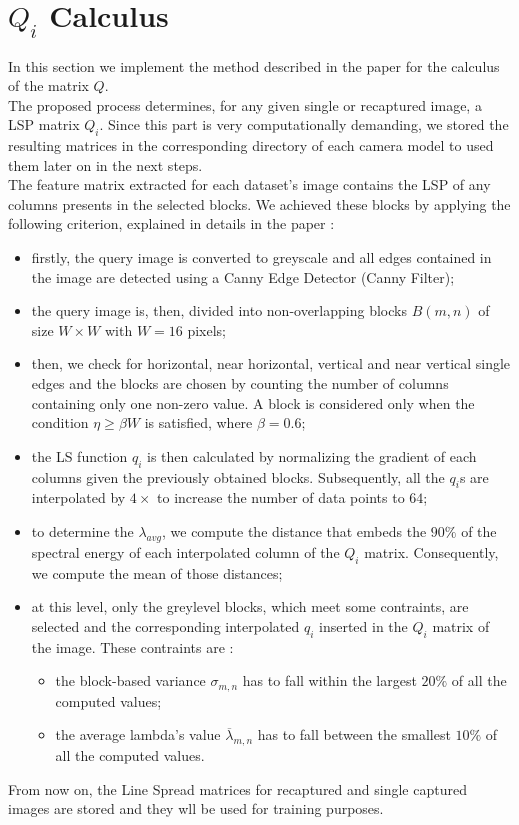 \section{$Q_i$ Calculus}
    In this section we implement the method described in the paper \cite{paper} for the calculus of the matrix $Q$.\\
    The proposed process determines, for any given single or recaptured image, a LSP matrix $Q_i$. 
    Since this part is very computationally demanding, we stored the resulting matrices in the corresponding directory of each camera model to used them later on in the next steps.\\

    The feature matrix extracted for each dataset's image contains the LSP of any columns presents in the selected blocks. We achieved these blocks by applying the following criterion, explained in details in the paper :
    \begin{itemize}
        \item firstly, the query image is converted to greyscale and all edges contained in the image are detected using a Canny Edge Detector (Canny Filter);
        \item the query image is, then, divided into non-overlapping blocks $B(m,n)$ of size $W \times W$ with $W=16$ pixels;
        \item then, we check for horizontal, near horizontal, vertical and near vertical single edges and the blocks are chosen by counting the number of columns containing only one non-zero value. A block is considered only when the condition $\eta \geq \beta W$ is satisfied, where $\beta=0.6$;
        \item the LS function $q_i$ is then calculated by normalizing the gradient of each columns given the previously obtained blocks. Subsequently, all the $q_i$s are interpolated by $4 \times$ to increase the number of data points to $64$;
        \item to determine the $\lambda_{avg}$, we compute the distance that embeds the $90\%$ of the spectral energy of each interpolated column of the $Q_i$ matrix. Consequently, we compute the mean of those distances;
        \item at this level, only the greylevel blocks, which meet some contraints, are selected and the corresponding interpolated $q_i$ inserted in the $Q_i$ matrix of the image. These contraints are :
        \begin{itemize}
            \item the block-based variance $\sigma_{m,n}$ has to fall within the largest $20\%$ of all the computed values;
            \item the average lambda's value $\overline{\lambda}_{m,n}$ has to fall between the smallest $10\%$ of all the computed values.
        \end{itemize}
    \end{itemize}
    From now on, the Line Spread matrices for recaptured and single captured images are stored and they wll be used for training purposes.